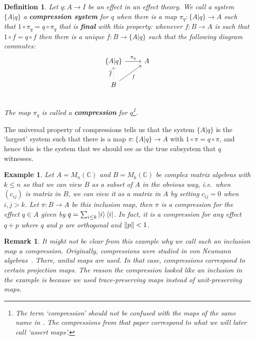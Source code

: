 \documentclass[b5paper,onecolumn,12pt,accepted=2019-05-03, issue=1, volume=1, shorttitle=papers/compositionality-1-1]{compositionalityarticle}
\newcounter{counter}
\numberwithin{counter}{section}
\newtheorem{definition}[counter]{Definition}
\newtheorem{remark}[counter]{Remark}
\newtheorem{example}[counter]{Example}
\newcommand{\C}{\mathbb{C}}
\newcommand{\cl}[1]{\overline{#1}}
\begin{document}
\begin{definition}\label{def:compression}
    Let $q: A\rightarrow I$ be an effect in an effect theory. We call a system $\{A\lvert q\}$ a \textbf{compression system} for $q$ when there is a map $\pi_q:\{A\lvert q\}\rightarrow A$ such that $1\circ \pi_q = q\circ \pi_q$ that is \textbf{final} with this property: whenever $f:B\rightarrow A$ is such that $1\circ f = q\circ f$ then there is a unique $\cl{f}:B\rightarrow \{A\lvert q\}$ such that the following diagram commutes:
    \[\begin{tikzcd}[ampersand replacement = \&]
    \{A\lvert q\} \arrow{r}{\pi_q}\& A \\
    B \arrow[dotted]{u}{\overline{f}}\arrow{ru}[swap]{f}\&  \\
    \end{tikzcd}\] 
    The map $\pi_q$ is called a \textbf{compression} for $q$\footnote{The term `compression' should not be confused with the maps of the same name in \cite{alfsen2012geometry}. The compressions from that paper correspond to what we will later call `assert maps'.}.
\end{definition}

The universal property of compressions tells us that the system $\{A\lvert q\}$ is the `largest' system such that there is a map $\pi:\{A\lvert q\}\rightarrow A$ with $1\circ\pi = q\circ \pi$, and hence this is the system that we should see as the true subsystem that $q$ witnesses.

\begin{example}
    Let $A=M_n(\C)$ and $B=M_k(\C)$ be complex matrix algebras with $k\leq n$ so that we can view $B$ as a subset of $A$ in the obvious way, i.e.\ when $(c_{ij})$ is matrix in $B$, we can view it as a matrix in $A$ by setting $c_{ij}=0$ when $i,j> k$. Let $\pi:B\rightarrow A$ be this inclusion map, then $\pi$ is a compression for the effect $q\in A$ given by $q=\sum_{i\leq k}\ket{i}\bra{i}$. In fact, it is a compression for any effect $q+p$ where $q$ and $p$ are orthogonal and $\norm{p} < 1$.
\end{example}

\begin{remark}
    It might not be clear from this example why we call such an inclusion map a compression. Originally, compressions were studied in von Neumann algebras~\cite{westerbaan2016universal}. There, unital maps are used. In that case, compressions correspond to certain projection maps. The reason the compression looked like an inclusion in the example is because we used trace-preserving maps instead of unit-preserving maps.
\end{remark}
\end{document}
